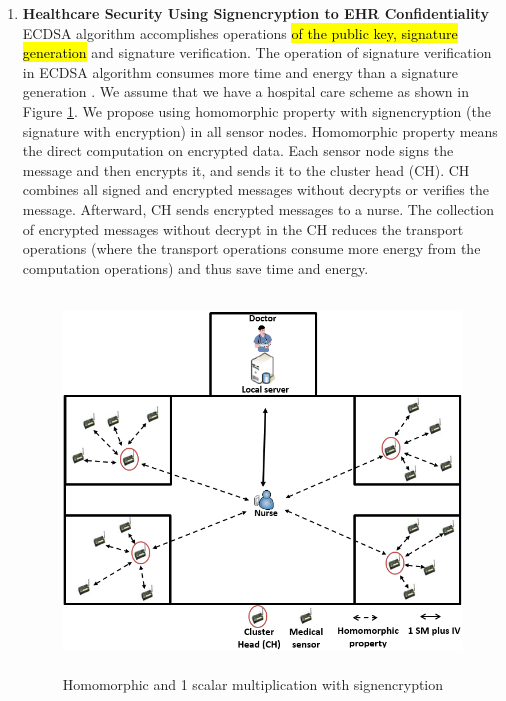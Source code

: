 \documentclass[a4paper,11pt]{article}
\DeclareRobustCommand{\hlyellow}[1]{{\sethlcolor{white}\hl{#1}}}
\begin{document}
\begin{enumerate}
\item \textbf{Healthcare Security Using Signencryption to EHR Confidentiality}\\
ECDSA algorithm accomplishes operations \hlyellow{of the public key, signature generation} and signature verification. The operation of signature verification in ECDSA algorithm consumes more time and energy than a signature generation \cite{p11, p15}. We assume that we have a hospital care scheme as shown in Figure \ref{fig:hospitalcare}. We propose using homomorphic property with signencryption (the signature with encryption) in all sensor nodes. Homomorphic property means the direct computation on encrypted data. Each sensor node signs the message and then encrypts it, and sends it to the cluster head (CH). CH combines all signed and encrypted messages without decrypts or verifies the message. Afterward, CH sends encrypted messages to a nurse. The collection of encrypted messages without decrypt in the CH reduces the transport operations (where the transport operations consume more energy from the computation operations) and thus save time and energy.

\begin{figure}[t]
	\centering
		\includegraphics[width=13cm,height=10cm]{pic/hospitalcare.png}
	\caption{Homomorphic and 1 scalar multiplication with signencryption}
	\label{fig:hospitalcare}
\end{figure}


\end{enumerate}
\end{document}
